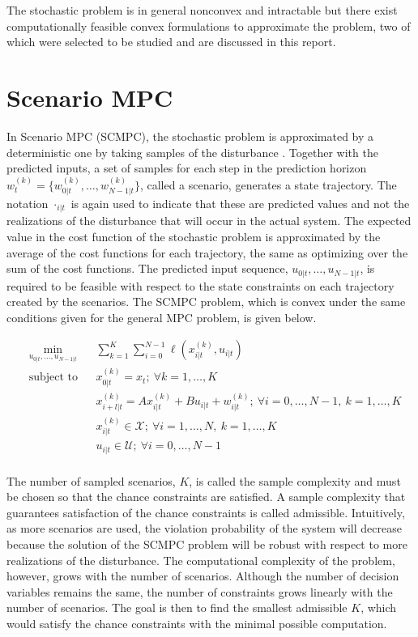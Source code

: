\documentclass[12 pt]{report}
\begin{document}
The stochastic problem is in general nonconvex and intractable but there exist computationally feasible convex formulations to approximate the problem, two of which were selected to be studied and are discussed in this report.

\section{Scenario MPC}

In Scenario MPC (SCMPC), the stochastic problem is approximated by a deterministic one by taking samples of the disturbance \cite{schildbach14}. Together with the predicted inputs, a set of samples for each step in the prediction horizon $w_t^{(k)} = \{w_{0|t}^{(k)}, \dots, w_{N-1|t}^{(k)} \} $, called a scenario, generates a state trajectory. The notation $\cdot_{i|t}$ is again used to indicate that these are predicted values and not the realizations of the disturbance that will occur in the actual system. The expected value in the cost function of the stochastic problem is approximated by the average of the cost functions for each trajectory, the same as optimizing over the sum of the cost functions. The predicted input sequence, $u_{0|t}, \dots, u_{N-1|t}$, is required to be feasible with respect to the state constraints on each trajectory created by the scenarios. The SCMPC problem, which is convex under the same conditions given for the general MPC problem, is given below.

\begin{equation*}
\begin{aligned}
& \min_{u_{0|t}, \dots, u_{N-1|t}} & & \sum_{k = 1}^{K} \sum_{i = 0}^{N-1} \ell (x_{i|t}^{(k)}, u_{i|t}) \\
& \text{subject to} & & x_{0|t}^{(k)} = x_t; ~ \forall k = 1,\dots,K \\
& & & x_{i+l|t}^{(k)} = Ax_{i|t}^{(k)} + Bu_{i|t} + w_{i|t}^{(k)}; ~ \forall i = 0, \dots, N-1, ~k = 1,\dots,K \\
& & & x_{i|t}^{(k)} \in \mathcal{X}; ~ \forall i = 1, \dots, N, ~k = 1,\dots,K \\
& & & u_{i|t} \in \mathcal{U}; ~ \forall i = 0, \dots, N-1 \\
\end{aligned}
\end{equation*}

The number of sampled scenarios, $K$, is called the sample complexity and must be chosen so that the chance constraints are satisfied. A sample complexity that guarantees satisfaction of the chance constraints is called admissible. Intuitively, as more scenarios are used, the violation probability of the system will decrease because the solution of the SCMPC problem will be robust with respect to more realizations of the disturbance. The computational complexity of the problem, however, grows with the number of scenarios. Although the number of decision variables remains the same, the number of constraints grows linearly with the number of scenarios. The goal is then to find the smallest admissible $K$, which would satisfy the chance constraints with the minimal possible computation.
\end{document}
